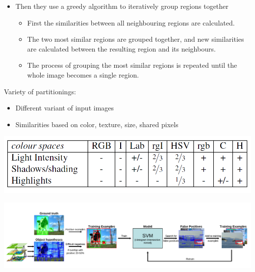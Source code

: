 \begin{frame}[allowframebreaks]
\begin{itemize}
	\item Then they use a greedy algorithm to iteratively
	group regions together
	\begin{itemize}
		\item First the similarities between all
		neighbouring regions are calculated.
		\item The two most similar regions
		are grouped together, and new similarities are calculated between
		the resulting region and its neighbours.
		\item The process of grouping
		the most similar regions is repeated until the whole image becomes
		a single region.
	\end{itemize}
\end{itemize}

Variety of partitionings:
\begin{itemize}
	\item Different variant of input images
	\item Similarities based on color, texture, size, shared pixels
\end{itemize}

\begin{center}
	\includegraphics[scale=0.6]{figs/selective_search_invariance_channel}
\end{center}

\framebreak


\begin{center}
	\includegraphics[scale=0.4]{figs/pipeline_selective_search}
\end{center}



\end{frame}


